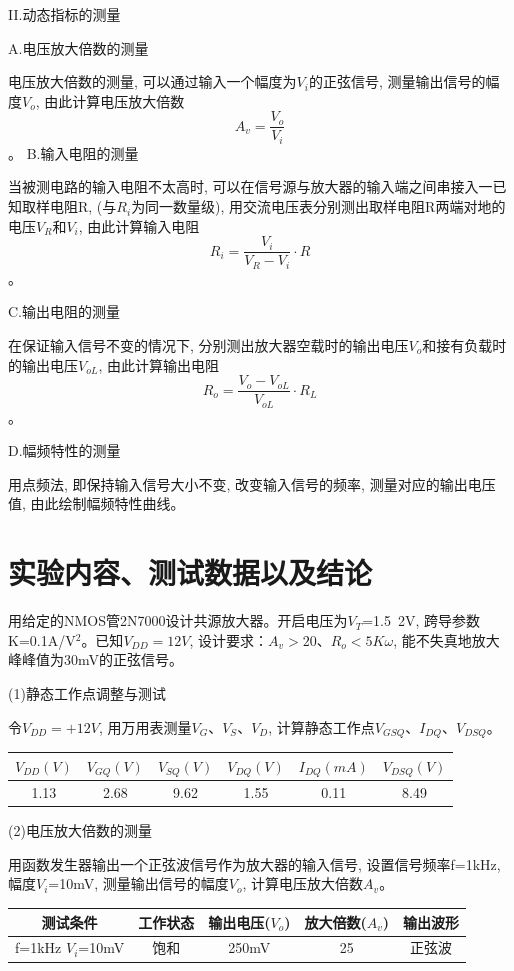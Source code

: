 \documentclass[10pt, a4paper]{article} %
\begin{document}
II.动态指标的测量

A.电压放大倍数的测量

电压放大倍数的测量, 可以通过输入一个幅度为$V_i$的正弦信号, 测量输出信号的幅度$V_o$, 由此计算电压放大倍数
$$
A_v = \frac{V_o}{V_i}
$$。
B.输入电阻的测量

当被测电路的输入电阻不太高时, 可以在信号源与放大器的输入端之间串接入一已知取样电阻R, (与$R_i$为同一数量级), 用交流电压表分别测出取样电阻R两端对地的电压$V_R$和$V_i$, 由此计算输入电阻
$$
R_i = \frac{V_i}{V_R-V_i} \cdot R
$$。

C.输出电阻的测量

在保证输入信号不变的情况下, 分别测出放大器空载时的输出电压$V_o$和接有负载时的输出电压$V_{oL}$, 由此计算输出电阻
$$
R_o = \frac{V_o - V_{oL}}{V_{oL}} \cdot R_L
$$。

D.幅频特性的测量

用点频法, 即保持输入信号大小不变, 改变输入信号的频率, 测量对应的输出电压值, 由此绘制幅频特性曲线。

\section{实验内容、测试数据以及结论}

用给定的NMOS管2N7000设计共源放大器。开启电压为$V_T$=1.5~2V, 跨导参数K=0.1A/V$^2$。已知$V_{DD}=12V$, 设计要求：$A_v > 20$、$R_o < 5K\omega$, 能不失真地放大峰峰值为30mV的正弦信号。

(1)静态工作点调整与测试

令$V_{DD} = +12V$, 用万用表测量$V_G$、$V_S$、$V_D$, 计算静态工作点$V_{GSQ}$、$I_{DQ}$、$V_{DSQ}$。

\begin{table}[ht]
    \centering
    \label{tab:a}
    \begin{tabular}{c|c|c|c|c|c}
        \toprule
        $V_{DD}(V)$&$V_{GQ}(V)$&$V_{SQ}(V)$&$V_{DQ}(V)$&$I_{DQ}(mA)$&$V_{DSQ}(V)$\\
        \midrule
        1.13&2.68&9.62&1.55&0.11&8.49\\ 
        \bottomrule
    \end{tabular}
\end{table}

(2)电压放大倍数的测量

用函数发生器输出一个正弦波信号作为放大器的输入信号, 设置信号频率f=1kHz, 幅度$V_i$=10mV, 测量输出信号的幅度$V_o$, 计算电压放大倍数$A_v$。

\begin{table}[ht]
    \centering
    \label{tab:b}
    \begin{tabular}{c|c|c|c|c}
        \toprule
        测试条件&工作状态&输出电压($V_o$)&放大倍数($A_v$)&输出波形\\
        \midrule
        \makecell{f=1kHz \\ $V_i$=10mV}&饱和&250mV&25&正弦波\\ 
        \bottomrule
    \end{tabular}
\end{table}
\end{document}

